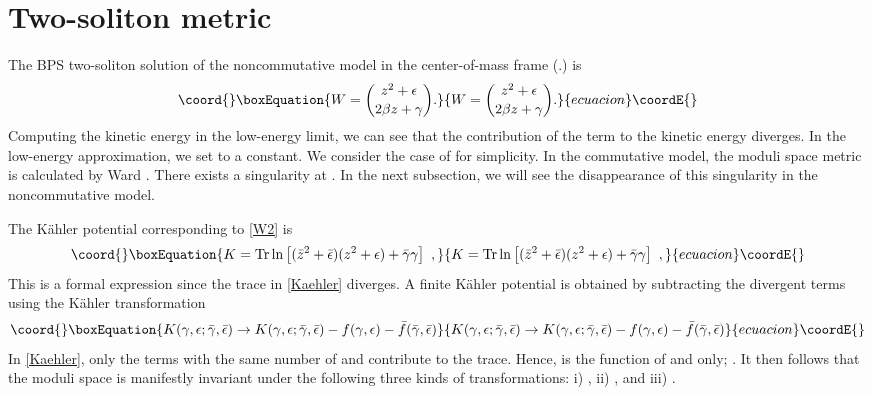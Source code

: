 \documentclass[a4paper,12pt]{article}
\begin{document}
\section{Two-soliton metric}
The BPS two-soliton solution of the noncommutative \coordHE{} model in the center-of-mass frame 
(\coordHE{}.) is
\begin{equation}\coord{}\boxEquation{
W=\binom{z^2+\epsilon}{2\beta z+\gamma}.\label{W2}
}{
W=\binom{z^2+\epsilon}{2\beta z+\gamma}.}{ecuacion}\coordE{}\end{equation}
Computing the kinetic energy in the low-energy limit, we can see that
the contribution of the \myHighlight{$\Dot{\Bar{\beta}}\dot{\beta}$}\coordHE{}
term to the kinetic energy diverges. In the low-energy approximation, 
we set \myHighlight{$\beta$}\coordHE{} to a constant.
We consider the case of \coordHE{} for simplicity. 
In the commutative model, the moduli space metric is calculated 
by Ward \cite{Ward}. There exists a singularity at \coordHE{}. 
In the next subsection, 
we will see the disappearance of this singularity in the 
noncommutative model.

The K\"ahler potential corresponding to \eqref{W2} is
\begin{equation}\coord{}\boxEquation{
K=\mbox{Tr}\ln\left[(\bar{z}^2+\bar{\epsilon})
(z^2+\epsilon)+\bar{\gamma}\gamma\right]\ ,\label{Kaehler}
}{
K=\mbox{Tr}\ln\left[(\bar{z}^2+\bar{\epsilon})
(z^2+\epsilon)+\bar{\gamma}\gamma\right]\ ,}{ecuacion}\coordE{}\end{equation}
This is a formal expression since the trace in 
\eqref{Kaehler} diverges.
A finite K\"ahler potential is obtained by subtracting the divergent terms 
using the K\"ahler transformation
\begin{equation}\coord{}\boxEquation{
K(\gamma,\epsilon;\bar{\gamma},\bar{\epsilon}) \rightarrow K(\gamma,\epsilon;\bar{\gamma},\bar{\epsilon})
-f(\gamma,\epsilon)-\bar{f}(\bar{\gamma},\bar{\epsilon})
}{
K(\gamma,\epsilon;\bar{\gamma},\bar{\epsilon}) \rightarrow K(\gamma,\epsilon;\bar{\gamma},\bar{\epsilon})
-f(\gamma,\epsilon)-\bar{f}(\bar{\gamma},\bar{\epsilon})
}{ecuacion}\coordE{}\end{equation}
In \eqref{Kaehler}, only the terms with the same number of \coordHE{} 
and \coordHE{} contribute to the trace. 
Hence, \coordHE{} is the function of \myHighlight{$\bar{\epsilon}\epsilon$}\coordHE{} 
and \myHighlight{$\bar{\gamma}\gamma$}\coordHE{} only; \coordHE{}. It then follows that the moduli 
space is manifestly invariant under the following
three kinds of transformations: 
i) \myHighlight{$(\epsilon, \gamma)\leftrightarrow (\bar{\epsilon}, \bar{\gamma})$}\coordHE{}, 
ii) \coordHE{}, 
and iii) \coordHE{}.
\end{document}
